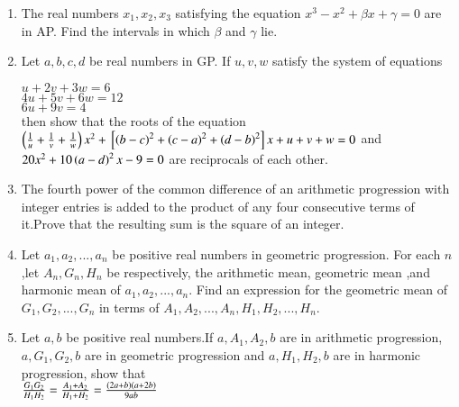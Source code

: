 \documentclass[journal,12pt,twocolumn]{IEEEtran}
\theoremstyle{remark}
\begin{document}
\begin{enumerate}
	      \hfill {}
       

		\item  The real numbers $ x_{1},x_{2},x_{3} $ satisfying the equation $ x^{3}-x^{2}+\beta x+\gamma=0 $ are in AP. Find the intervals in which $ \beta $ and $\gamma$ lie.
       
			\hfill {}
      

      \item  Let $ a,b,c,d $ be real numbers in GP. If $u,v,w$ satisfy the system of equations  
    
	      \hfill {}
      
      $    u+2v+3w=6 $ \\
      $    4u+5v+6w=12 $ \\
      $    6u+9v=4 $ \\
      then show that the roots of the equation \\
		$\left(\frac{1}{u}+\frac{1}{v}+\frac{1}{w}\right)x^{2}+{}\left[\left(b-c\right)^{2}+\left(c-a\right)^{2}+\left(d-b\right)^{2}\right]x+u+v+w=0 $ and $ 20x^{2}+10\left(a-d\right)^{2}x-9=0 $ are reciprocals of each other.

      \item The fourth power of the common difference of an arithmetic progression with integer entries is added to the product of any four consecutive terms of it.Prove that the resulting sum is the square of an integer.
      
	      \hfill {}
    

      \item Let $ a_{1},a_{2},...,a_{n} $ be positive real numbers in geometric progression. For each $n$,let $ A_{n},G_{n},H_{n} $ be respectively, the arithmetic mean, geometric mean ,and harmonic mean of $ a_{1},a_{2},...,a_{n}.$ Find an expression for the geometric mean of $ G_{1},G_{2},...,G_{n} $ in terms of $ A_{1},A_{2},...,A_{n},H_{1},H_{2},...,H_{n}.$ 
      
	      \hfill {}                              
       
       \item Let $a,b$ be positive real numbers.If $ a,A_{1},A_{2},b $ are in arithmetic progression, $ a,G_{1},G_{2},b $ are in geometric progression and $ a,H_{1},H_{2},b $ are in harmonic progression, show that \\ 
	       $ \frac{G_{1}G_{2}}{H_{1}H_{2}}=\frac{A_{1}+A_{2}}{H_{1}+H_{2}}=\frac{\left(2a+b\right)\left(a+2b\right)}{9ab} $ 


\end{enumerate}
\end{document}
